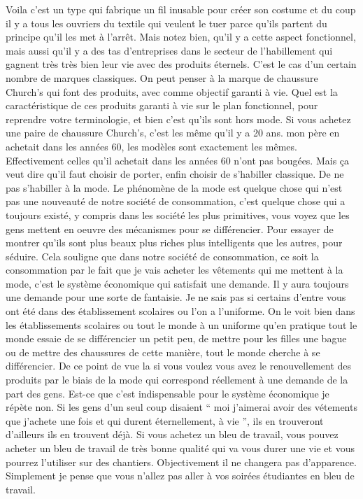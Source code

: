 \begin{small}
Voila c'est un type qui fabrique un fil inusable pour créer son costume et du coup il y a tous les ouvriers du textile qui veulent le tuer parce qu'ils partent du principe qu'il les met à l'arrêt. Mais notez bien, qu'il y a cette aspect fonctionnel, mais aussi qu'il y a des tas d'entreprises dans le secteur de l'habillement qui gagnent très très bien leur vie avec des produits éternels. C'est le cas d'un certain nombre de marques classiques. On peut penser à la marque de chaussure Church's qui font des produits, avec comme objectif garanti à vie. Quel est la caractéristique de ces produits garanti à vie sur le plan fonctionnel, pour reprendre votre terminologie, et bien c'est qu'ils sont hors mode. Si vous achetez une paire de chaussure Church's, c'est les même qu'il y a 20 ans. mon père en achetait dans les années 60, les modèles sont exactement les mêmes. Effectivement celles qu'il achetait dans les années 60 n'ont pas bougées. Mais ça veut dire qu'il faut choisir de porter, enfin choisir de s'habiller classique. De ne pas s'habiller à la mode. Le phénomène de la mode est quelque chose qui n'est pas une nouveauté de notre société de consommation, c'est quelque chose qui a toujours existé, y compris dans les société les plus primitives, vous voyez que les gens mettent en oeuvre des mécanismes pour se différencier. Pour essayer de montrer qu'ils sont plus beaux plus riches plus intelligents que les autres, pour séduire. Cela souligne que dans notre société de consommation, ce soit la consommation par le fait que je vais acheter les vêtements qui me mettent à la mode, c'est le système économique qui satisfait une demande. Il y aura toujours une demande pour une sorte de fantaisie. Je ne sais pas si certains d'entre vous ont été dans des établissement scolaires ou l'on a l'uniforme. On le voit bien dans les établissements scolaires ou tout le monde à un uniforme qu'en pratique tout le monde essaie de se différencier un petit peu, de mettre pour les filles une bague ou de mettre des chaussures de cette manière, tout le monde cherche à se différencier. De ce point de vue la si vous voulez vous avez le renouvellement des produits par le biais de la mode qui correspond réellement à une demande de la part des gens. Est-ce que c'est indispensable pour le système économique je répète non. Si les gens d'un seul coup disaient “ moi j'aimerai avoir des vétements que j'achete une fois et qui durent éternellement, à vie ”, ils en trouveront d'ailleurs ils en trouvent déjà. Si vous achetez un bleu de travail, vous pouvez acheter un bleu de travail de très bonne qualité qui va vous durer une vie et vous pourrez l'utiliser sur des chantiers. Objectivement il ne changera pas d'apparence. Simplement je pense que vous n'allez pas aller à vos soirées étudiantes en bleu de travail.


\end{small}
